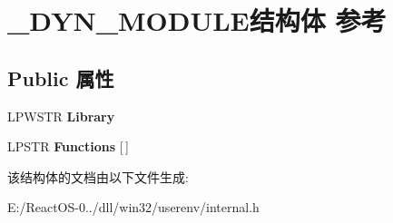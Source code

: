 \hypertarget{struct___d_y_n___m_o_d_u_l_e}{}\section{\+\_\+\+D\+Y\+N\+\_\+\+M\+O\+D\+U\+L\+E结构体 参考}
\label{struct___d_y_n___m_o_d_u_l_e}
\subsection*{Public 属性}
\begin{DoxyCompactItemize}
\item 
\mbox{\label{struct___d_y_n___m_o_d_u_l_e_a9cf6404726caa4a8ac2b3dcce577bce7}} 
L\+P\+W\+S\+TR {\bfseries Library}
\item 
\mbox{\label{struct___d_y_n___m_o_d_u_l_e_adc84f23f63fe3e798a1bd7f6800618a3}} 
L\+P\+S\+TR {\bfseries Functions} \mbox{[}$\,$\mbox{]}
\end{DoxyCompactItemize}


该结构体的文档由以下文件生成\+:\begin{DoxyCompactItemize}
\item 
E\+:/\+React\+O\+S-\/0../dll/win32/userenv/internal.\+h\end{DoxyCompactItemize}
